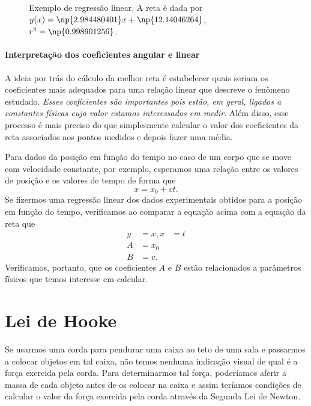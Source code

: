 \begin{figure}[!h]
\centering

\caption{Exemplo de regressão linear. A reta é dada por $y(x)=\np{2.984480401}x + \np{12.14046264}$, $r^2 = \np{0.998901256}$.}
\label{RetasConjuntosDados1}
\end{figure}

\paragraph{Interpretação dos coeficientes angular e linear}

A ideia por trás do cálculo da melhor reta é estabelecer quais seriam os coeficientes mais adequados para uma relação linear que descreve o fenômeno estudado. \emph{Esses coeficientes são importantes pois estão, em geral, ligados a constantes físicas cujo valor estamos interessados em medir}. Além disso, esse processo é mais preciso do que simplesmente calcular o valor dos coeficientes da reta associados aos pontos medidos e depois fazer uma média.

Para dados da posição em função do tempo no caso de um corpo que se move com velocidade constante, por exemplo, esperamos uma relação entre os valores de posição e os valores de tempo de forma que
\begin{equation}
    x = x_0 + vt.
\end{equation}
%
Se fizermos uma regressão linear dos dados experimentais obtidos para a posição em função do tempo, verificamos ao comparar a equação acima com a equação da reta que
\begin{align}
    y &= x,
    x &= t \\
    A &= x_0 \\
    B &= v.
\end{align}
%
Verificamos, portanto, que os coeficientes $A$ e $B$ estão relacionados a parâmetros físicos que temos interesse em calcular.

\section{Lei de Hooke}

Se usarmos uma corda para pendurar uma caixa ao teto de uma sala e passarmos a colocar objetos em tal caixa, não temos nenhuma indicação visual de qual é a força exercida pela corda. Para determinarmos tal força, poderíamos aferir a massa de cada objeto antes de os colocar na caixa e assim teríamos condições de calcular o valor da força exercida pela corda através da Segunda Lei de Newton.

